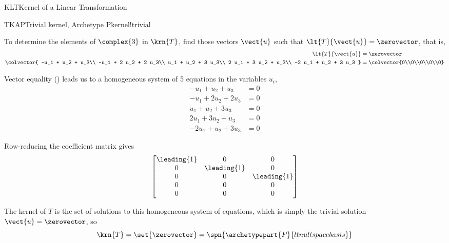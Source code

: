 \begin{subsect}{KLT}{Kernel of a Linear Transformation}
\begin{example}{TKAP}{Trivial kernel, Archetype P}{kernel!trivial}
%
\begin{para}To determine the elements of $\complex{3}$ in $\krn{T}$, find those vectors $\vect{u}$ such that $\lt{T}{\vect{u}}=\zerovector$, that is,
%
\begin{align*}
\lt{T}{\vect{u}}&=\zerovector\\
\colvector{
-u_1 + u_2 + u_3\\
-u_1 + 2 u_2 + 2 u_3\\
u_1 + u_2 + 3 u_3\\
2 u_1 + 3 u_2 + u_3\\
-2 u_1 + u_2 + 3 u_3
}
&=
\colvector{0\\0\\0\\0\\0}
%
\end{align*}
\end{para}
%
\begin{para}Vector equality () leads us to a homogeneous system of 5 equations in the variables $u_i$,
%
\begin{align*}
-u_1 + u_2 + u_3&=0\\
-u_1 + 2 u_2 + 2 u_3&=0\\
u_1 + u_2 + 3 u_3&=0\\
2 u_1 + 3 u_2 + u_3&=0\\
-2 u_1 + u_2 + 3 u_3&=0
\end{align*}
\end{para}
%
\begin{para}Row-reducing the coefficient matrix gives
%
\begin{equation*}
\begin{bmatrix}
\leading{1} & 0 & 0\\
0 & \leading{1} & 0\\
0 & 0 & \leading{1}\\
0 & 0 & 0\\
0 & 0 & 0
\end{bmatrix}
\end{equation*}
\end{para}
%
\begin{para}The kernel of $T$ is the set of solutions to this homogeneous system of equations, which is simply the trivial solution $\vect{u}=\zerovector$, so
%
\begin{equation*}
\krn{T}=\set{\zerovector}=\spn{\archetypepart{P}{ltnullspacebasis}}\end{equation*}
\end{para}
%
\end{example}

\end{subsect}
